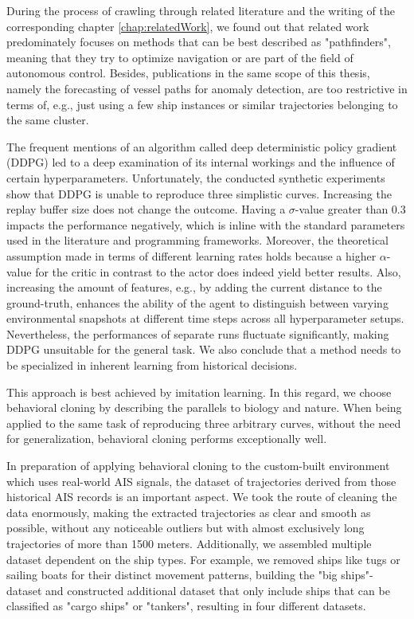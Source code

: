 During the process of crawling through related literature and the writing of the corresponding chapter \ref{chap:relatedWork}, we found out that related work predominately focuses on methods that can be best described as "pathfinders", meaning that they try to optimize navigation or are part of the field of autonomous control. Besides, publications in the same scope of this thesis, namely the forecasting of vessel paths for anomaly detection, are too restrictive in terms of, e.g., just using a few ship instances or similar trajectories belonging to the same cluster.
\par
The frequent mentions of an algorithm called deep deterministic policy gradient (DDPG) led to a deep examination of its internal workings and the influence of certain hyperparameters. Unfortunately, the conducted synthetic experiments show that DDPG is unable to reproduce three simplistic curves. Increasing the replay buffer size does not change the outcome. Having a $\sigma$-value greater than 0.3 impacts the performance negatively, which is inline with the standard parameters used in the literature and programming frameworks. Moreover, the theoretical assumption made in terms of different learning rates holds because a higher $\alpha$-value for the critic in contrast to the actor does indeed yield better results. Also, increasing the amount of features, e.g., by adding the current distance to the ground-truth, enhances the ability of the agent to distinguish between varying environmental snapshots at different time steps across all hyperparameter setups. Nevertheless, the performances of separate runs fluctuate significantly, making DDPG unsuitable for the general task. We also conclude that a method needs to be specialized in inherent learning from historical decisions.
\par
This approach is best achieved by imitation learning. In this regard, we choose behavioral cloning by describing the parallels to biology and nature. When being applied to the same task of reproducing three arbitrary curves, without the need for generalization, behavioral cloning performs exceptionally well.
\par
In preparation of applying behavioral cloning to the custom-built environment which uses real-world AIS signals, the dataset of trajectories derived from those historical AIS records is an important aspect.
We took the route of cleaning the data enormously, making the extracted trajectories as clear and smooth as possible, without any noticeable outliers but with almost exclusively long trajectories of more than 1500 meters. Additionally, we assembled multiple dataset dependent on the ship types. For example, we removed ships like tugs or sailing boats for their distinct movement patterns, building the "big ships"-dataset and constructed additional dataset that only include ships that can be classified as "cargo ships" or "tankers", resulting in four different datasets.
